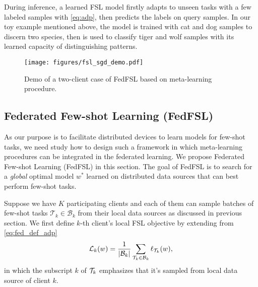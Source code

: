 During inference, a learned FSL model firstly adapts to unseen tasks with a few labeled samples with \eqref{eq:adp}, then predicts the labels on query samples. In our toy example mentioned above, the model is trained with cat and dog samples to discern two species, then is used to classify tiger and wolf samples with its learned capacity of distinguishing patterns. 

\begin{figure}
\begin{center}
\texttt{[image: figures/fsl\_sgd\_demo.pdf]}
\end{center}
\vspace{-10pt}
\caption{Demo of a two-client case of FedFSL based on meta-learning procedure.
}\label{fig:fed_fsl_2_client}
\vspace{-10pt}
\end{figure}

\subsection{Federated Few-shot Learning (FedFSL)}
\label{sec:fed_maml}
As our purpose is to facilitate distributed devices to learn models for few-shot tasks,  we need study how to design such a framework in which meta-learning procedures can be integrated in the federated learning.
We propose Federated Few-shot Learning (FedFSL) in this section. The goal of FedFSL is to search for a \textit{global} optimal model $w^*$ learned on distributed data sources that can best perform few-shot tasks.

Suppose we have $K$ participating clients and each of them can sample batches of few-shot tasks $\mathcal{T}_k \in \mathcal{B}_k$ from their local data sources as discussed in previous section. We first define $k$-th client's local FSL objective by extending from \eqref{eq:fed_def_adp}
\begin{equation}
\begin{split}
\mathcal{L}_k(w) & = \frac{1}{|\mathcal{B}_k|} \sum_{\mathcal{T}_k \in \mathcal{B}_k} \ell_{\mathcal{T}_k}(w), \\
\end{split}
\label{eq:fed_def_adp_k}
\end{equation}
in which the subscript $k$ of $\mathcal{T}_k$ emphasizes that it's sampled from local data source of client $k$.


